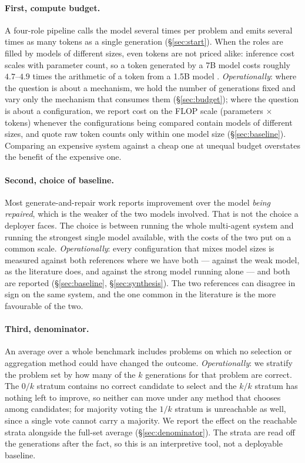 \documentclass[11pt,a4paper]{article}
\begin{document}
\paragraph{First, compute budget.} A four-role pipeline calls the model several times per problem
and emits several times as many tokens as a single generation (\S\ref{sec:start}). When the roles
are filled by models of different sizes, even tokens are not priced alike: inference cost scales
with parameter count, so a token generated by a 7B model costs roughly $4.7$--$4.9$ times the
arithmetic of a token from a 1.5B model \cite{kaplan2020}. \emph{Operationally}: where the
question is about a mechanism, we hold the number of generations fixed and vary only the mechanism
that consumes them (\S\ref{sec:budget}); where the question is about a configuration, we report
cost on the FLOP scale (parameters $\times$ tokens) whenever the configurations being compared
contain models of different sizes, and quote raw token counts only within one model size
(\S\ref{sec:baseline}). Comparing an expensive system against a cheap one at unequal budget
overstates the benefit of the expensive one.

\paragraph{Second, choice of baseline.} Most generate-and-repair work reports improvement over the
model \emph{being repaired}, which is the weaker of the two models involved. That is not the
choice a deployer faces. The choice is between running the whole multi-agent system and running
the strongest single model available, with the costs of the two put on a common scale.
\emph{Operationally}: every configuration
that mixes model sizes is measured against both references where we have both --- against the weak
model, as the literature does, and against the strong model running alone --- and both are
reported (\S\ref{sec:baseline}, \S\ref{sec:synthesis}). The two references can disagree in sign on
the same system, and the one common in the literature is the more favourable of the two.

\paragraph{Third, denominator.} An average over a whole benchmark includes problems on which no
selection or aggregation method could have changed the outcome. \emph{Operationally}: we stratify
the problem set by how many of the $k$ generations for that problem are correct. The $0/k$ stratum
contains no correct candidate to select and the $k/k$ stratum has nothing left to improve, so
neither can move under any method that chooses among candidates; for majority voting the $1/k$
stratum is unreachable as well, since a single vote cannot carry a majority. We report the effect
on the reachable strata alongside the full-set average (\S\ref{sec:denominator}). The strata are
read off the generations after the fact, so this is an interpretive tool, not a deployable
baseline.
\end{document}
